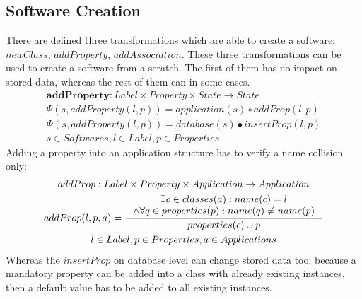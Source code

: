 \documentclass[11pt]{article}
\begin{document}
\subsection{Software Creation}
There are defined three transformations which are able to create a software: $newClass$, $addProperty$, $addAssociation$. These three transformations can be used to create a software from a scratch. The first of them has no impact on stored data, whereas the rest of them can in some cases.
\begin{gather*}
\mathbf{addProperty} : Label \times Property \times State \rightarrow State \\
\Psi(s, addProperty(l, p)) = application(s) \circ addProp(l,p) \\
\Phi(s, addProperty(l, p)) = database(s) \bullet insertProp(l, p) \\
s \in Softwares, l \in Label, p \in Properties
\end{gather*}
Adding a property into an application structure has to verify a name collision only:
\begin{gather*}
addProp : Label \times Property \times Application \rightarrow Application \\
addProp(l, p, a) = \inference{\exists c \in classes(a) : name(c) = l \\ \wedge \forall q \in  properties(p) : name(q) \neq name(p)}{properties(c) \cup p } \\
l \in Label, p \in Properties, a \in Applications
\end{gather*}
Whereas the $insertProp$ on database level can change stored data too, because a mandatory property can be added into a class with already existing instances, then a default value has to be added to all existing instances.
\end{document}

